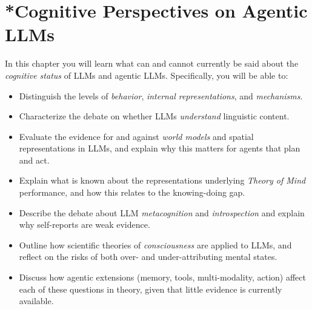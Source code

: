 
\chapter{*Cognitive Perspectives on Agentic LLMs}\label{chap:cognition}


\begin{learningbox}
In this chapter you will learn what can and cannot currently be said about the \emph{cognitive status} of LLMs and agentic LLMs. Specifically, you will be able to:
\begin{itemize}
    \item Distinguish the levels of \emph{behavior}, \emph{internal representations}, and \emph{mechanisms}.
    \item Characterize the debate on whether LLMs \emph{understand} linguistic content.
    \item Evaluate the evidence for and against \emph{world models} and spatial representations in LLMs, and explain why this matters for agents that plan and act.
    \item Explain what is known about the representations underlying \emph{Theory of Mind} performance, and how this relates to the knowing-doing gap.
    \item Describe the debate about LLM \emph{metacognition} and \emph{introspection} and explain why self-reports are weak evidence.
    \item Outline how scientific theories of \emph{consciousness} are applied to LLMs, and reflect on the risks of both over- and under-attributing mental states.
    \item Discuss how agentic extensions (memory, tools, multi-modality, action) affect each of these questions in theory, given that little evidence is currently available.
\end{itemize}
\end{learningbox}

